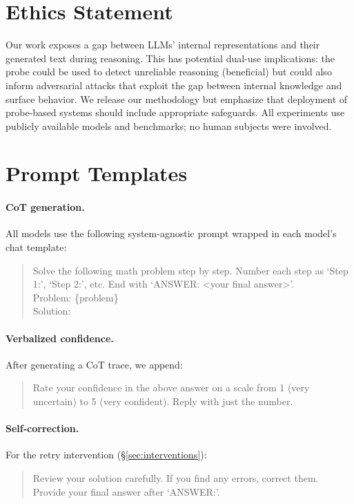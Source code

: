 \documentclass[11pt]{article}
\begin{document}
\section*{Ethics Statement}

Our work exposes a gap between LLMs' internal representations and their generated text during reasoning.
This has potential dual-use implications: the probe could be used to detect unreliable reasoning (beneficial) but could also inform adversarial attacks that exploit the gap between internal knowledge and surface behavior.
We release our methodology but emphasize that deployment of probe-based systems should include appropriate safeguards.
All experiments use publicly available models and benchmarks; no human subjects were involved.




\clearpage
\appendix

\section{Prompt Templates}
\label{app:prompts}

\paragraph{CoT generation.}
All models use the following system-agnostic prompt wrapped in each model's chat template:
\begin{quote}\small\ttfamily
Solve the following math problem step by step. Number each step as `Step 1:', `Step 2:', etc. End with `ANSWER: <your final answer>'.\\[4pt]
Problem: \{problem\}\\[4pt]
Solution:
\end{quote}

\paragraph{Verbalized confidence.}
After generating a CoT trace, we append:
\begin{quote}\small\ttfamily
Rate your confidence in the above answer on a scale from 1 (very uncertain) to 5 (very confident). Reply with just the number.
\end{quote}

\paragraph{Self-correction.}
For the retry intervention (\S\ref{sec:interventions}):
\begin{quote}\small\ttfamily
Review your solution carefully. If you find any errors, correct them. Provide your final answer after `ANSWER:'.
\end{quote}
\end{document}
